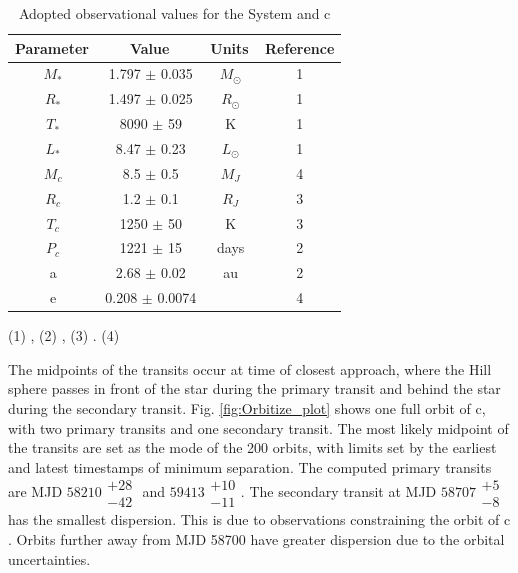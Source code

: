 \begin{table}
\centering
\begin{threeparttable}
\caption{Adopted observational values for the \pic System and \pic c}
\vspace{0.05in}
\label{bpicparams}
\begin{tabular}{cccc} %
\hline
Parameter\,&Value\,&Units\,&Reference\\
\hline
\hline
$M_*$       & 1.797 $\pm$ 0.035     & $M_\odot$ & 1\\
$R_*$       & 1.497 $\pm$ 0.025     & $R_\odot$ & 1\\
$T_*$       & 8090 $\pm$ 59         & K         & 1\\
$L_*$       & 8.47 $\pm$ 0.23     & $L_{\odot}$ & 1\\
$M_c$       & 8.5 $\pm$ 0.5    & $M_J$     & 4\\
$R_c$       & 1.2 $\pm$ 0.1     & $R_J$     & 3\\
$T_c$       & 1250 $\pm$ 50      & K         & 3\\
$P_c$       & 1221 $\pm$ 15      & days         & 2\\
  a           & 2.68 $\pm$ 0.02 & au       & 2 \\
  e          &   0.208 $\pm$ 0.0074   &       & 4 \\
\hline
\end{tabular}
\begin{tablenotes}
\small
\item (1) \citet{Zwintz_2019},
(2) \citet{Lacour_2021},
(3) \citet{Nowak_2020}. (4) \citet{Vandal_2020}
\end{tablenotes}
\label{tab:orbitize_param}
\end{threeparttable}

\end{table}

The midpoints of the transits occur at time of closest approach, where the Hill sphere passes in front of the star during the primary transit and behind the star during the secondary transit. 
%
Fig. \ref{fig:Orbitize_plot} shows one full orbit of \pic c, with two primary transits and one secondary transit. 
%
The most likely midpoint of the transits are set as the mode of the 200 orbits, with limits set by the earliest and latest timestamps of minimum separation. 
%
The computed primary transits are MJD $\text{58210} \substack{+\text{28} \\ -\text{42}}$ and $\text{59413} \substack{+\text{10} \\ -\text{11}}$. 
%
The secondary transit at MJD $\text{58707}\substack{+\text{5} \\ -\text{8}}$ has the smallest dispersion. 
%
This is due to observations constraining the orbit of \pic c \citep{Vandal_2020}. 
%
Orbits further away from MJD 58700 have greater dispersion due to the orbital uncertainties. 


